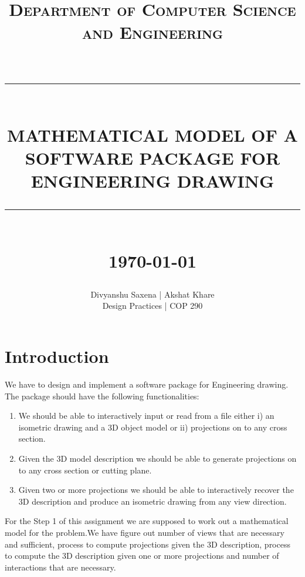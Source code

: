 \documentclass[12pt]{report}
\newcommand{\HRule}[1]{\rule{\linewidth}{#1}}
\begin{document}
\title{ \normalfont  \textsc{Department of Computer Science and Engineering} \\[2pt]
		\\ [2.0cm]
		\HRule{0.5pt} \\
		\LARGE \textbf{\uppercase{Mathematical Model of a Software Package for Engineering Drawing }}
		\HRule{2pt} \\ [0.5cm]
		\normalsize \today \vspace*{5\baselineskip}}

\date{}

\author{
		Divyanshu Saxena | Akshat Khare \\ 
		Design Practices | COP 290   \\
		 }

\maketitle
\tableofcontents
\newpage

\sectionfont{\scshape}


\section*{Introduction}
We have to design and implement a software package for Engineering drawing. The package should have the following functionalities:
\begin{enumerate}
\item We should be able to interactively input or read from a file either i) an isometric drawing and a 3D object model or ii) projections on to any cross section.
\item Given the 3D model description we should be able to generate projections on to any cross section or cutting plane.
\item Given two or more projections we should be able to interactively recover the 3D description and produce an isometric drawing from any view direction.
\end{enumerate}
For the Step 1 of this assignment we are supposed to work out a mathematical model for the problem.We have figure out number of views that are necessary and sufficient, process to compute projections given the 3D description, process to compute the 3D description given one or more projections and number of interactions that are necessary.
\end{document}

